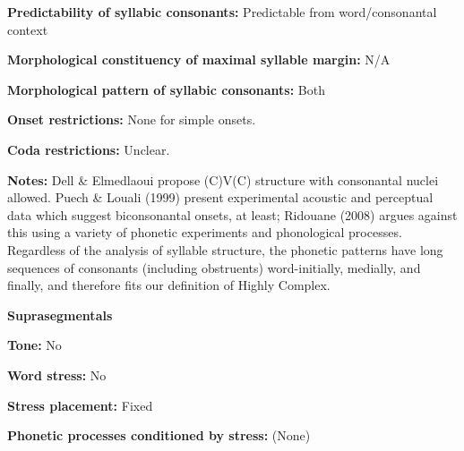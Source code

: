 \begin{styleBody}
\textbf{Predictability of syllabic consonants:} Predictable from word/consonantal context
\end{styleBody}

\begin{styleBody}
\textbf{Morphological constituency of maximal syllable margin:} N/A
\end{styleBody}

\begin{styleBody}
\textbf{Morphological pattern of syllabic consonants:} Both
\end{styleBody}

\begin{styleBody}
\textbf{Onset restrictions: }None for simple onsets.
\end{styleBody}

\begin{styleBody}
\textbf{Coda restrictions:} Unclear.
\end{styleBody}

\begin{styleBody}
\textbf{Notes: }Dell \& Elmedlaoui propose (C)V(C) structure with consonantal nuclei allowed. Puech \& Louali (1999) present experimental acoustic and perceptual data which suggest biconsonantal onsets, at least; Ridouane (2008) argues against this using a variety of phonetic experiments and phonological processes. Regardless of the analysis of syllable structure, the phonetic patterns have long sequences of consonants (including obstruents) word-initially, medially, and finally, and therefore fits our definition of Highly Complex.
\end{styleBody}

\begin{styleBody}
\textbf{Suprasegmentals}
\end{styleBody}

\begin{styleBody}
\textbf{Tone:} No
\end{styleBody}

\begin{styleBody}
\textbf{Word stress:} No
\end{styleBody}

\begin{styleBody}
\textbf{Stress placement:} Fixed
\end{styleBody}

\begin{styleBody}
\textbf{Phonetic processes conditioned by stress:} (None)
\end{styleBody}

